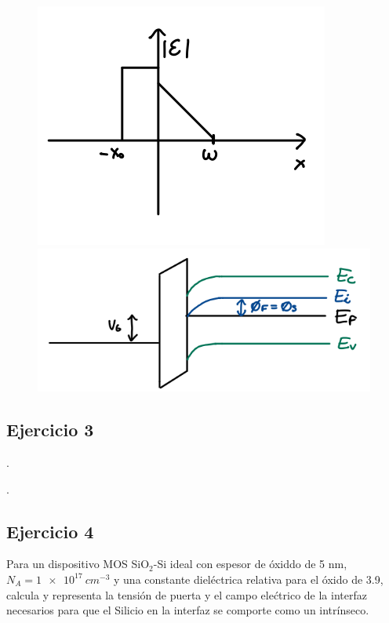 \begin{enumerate}[label=\alph*)]
	      \begin{figure}[H]\centering
		      \includegraphics[width=0.45\linewidth]{Ejercicios/Ch_05/Ej_02_a.png} \hfill
		      \includegraphics[width=0.45\linewidth]{Ejercicios/Ch_05/Ej_02_b.png}
		      \centering\end{figure}
\end{enumerate}



\vspace*{2em}


\begin{Enunciado}
	\subsection*{Ejercicio 3}

	\lipsum[1].
\end{Enunciado}

\vspace*{1em}

\lipsum[1].


\begin{Enunciado}
	\subsection*{Ejercicio 4}

	Para un dispositivo MOS SiO$_2$-Si ideal con espesor de óxiddo de 5 nm, $N_A = \SI{1e17}{cm^{-3}}$ y una constante dieléctrica relativa para el óxido de 3.9, calcula y representa la tensión de puerta y el campo elećtrico de la interfaz necesarios para que el Silicio en la interfaz se comporte como un intrínseco.
\end{Enunciado}

